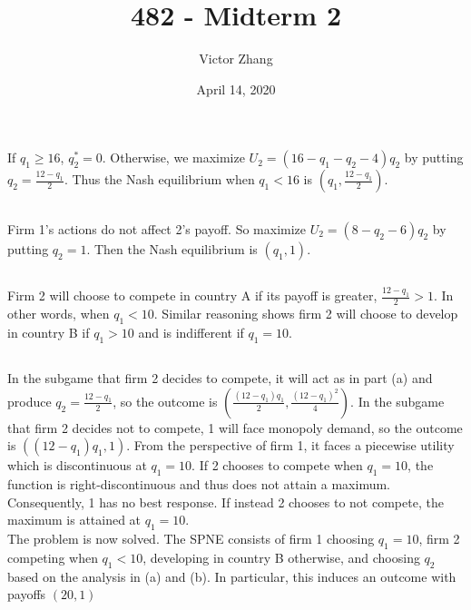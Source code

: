 \documentclass{article}
\title{482 - Midterm 2}
\author{Victor Zhang}
\date{April 14, 2020}
\begin{document}
\maketitle

\section{}
\subsection{}
If $q_1 \geq 16$, $q_2^{*} = 0$. Otherwise, we maximize $U_2 = (16-q_1-q_2-4)q_2$ by putting $q_2 = \frac{12-q_1}{2}$. Thus the Nash equilibrium when $q_1 < 16$ is $(q_1,\frac{12-q_1}{2})$.
\subsection{}
Firm 1's actions do not affect 2's payoff. So maximize $U_2 = (8-q_2-6)q_2$ by putting $q_2 = 1$. Then the Nash equilibrium is $(q_1,1)$.
\subsection{}
Firm 2 will choose to compete in country A if its payoff is greater, $\frac{12-q_1}{2} > 1$. In other words, when $q_1 < 10$. Similar reasoning shows firm 2 will choose to develop in country B if $q_1 > 10$ and is indifferent if $q_1=10$.
\subsection{}
In the subgame that firm 2 decides to compete, it will act as in part (a) and produce $q_2 = \frac{12 - q_1}{2}$, so the outcome is $(\frac{(12-q_1)q_1}{2}, \frac{\left(12-q_1\right)^2}{4})$. In the subgame that firm 2 decides not to compete, 1 will face monopoly demand, so the outcome is $((12-q_1)q_1,1)$.
From the perspective of firm 1, it faces a piecewise utility which is discontinuous at $q_1 = 10$. If 2 chooses to compete when $q_1 = 10$, the function is right-discontinuous and thus does not attain a maximum. Consequently, 1 has no best response. If instead 2 chooses to not compete, the maximum is attained at $q_1 = 10$.\\
The problem is now solved. The SPNE consists of firm 1 choosing $q_1 = 10$, firm 2 competing when $q_1 < 10$, developing in country B otherwise, and choosing $q_2$ based on the analysis in (a) and (b). In particular, this induces an outcome with payoffs $(20,1)$
\end{document}
